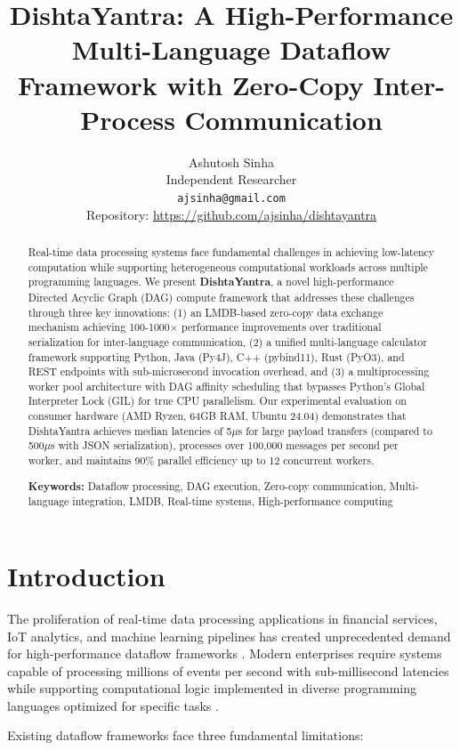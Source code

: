 \documentclass[11pt,a4paper]{article}
\title{\textbf{DishtaYantra: A High-Performance Multi-Language Dataflow Framework with Zero-Copy Inter-Process Communication}}
\author{
    Ashutosh Sinha\\
    Independent Researcher\\
    \texttt{ajsinha@gmail.com}\\[1em]
    Repository: \url{https://github.com/ajsinha/dishtayantra}
}
\date{}
\begin{document}
\maketitle

\begin{abstract}
Real-time data processing systems face fundamental challenges in achieving low-latency computation while supporting heterogeneous computational workloads across multiple programming languages. We present \textbf{DishtaYantra}, a novel high-performance Directed Acyclic Graph (DAG) compute framework that addresses these challenges through three key innovations: (1) an LMDB-based zero-copy data exchange mechanism achieving 100-1000$\times$ performance improvements over traditional serialization for inter-language communication, (2) a unified multi-language calculator framework supporting Python, Java (Py4J), C++ (pybind11), Rust (PyO3), and REST endpoints with sub-microsecond invocation overhead, and (3) a multiprocessing worker pool architecture with DAG affinity scheduling that bypasses Python's Global Interpreter Lock (GIL) for true CPU parallelism. Our experimental evaluation on consumer hardware (AMD Ryzen, 64GB RAM, Ubuntu 24.04) demonstrates that DishtaYantra achieves median latencies of 5$\mu$s for large payload transfers (compared to 500$\mu$s with JSON serialization), processes over 100,000 messages per second per worker, and maintains 90\% parallel efficiency up to 12 concurrent workers.

\textbf{Keywords:} Dataflow processing, DAG execution, Zero-copy communication, Multi-language integration, LMDB, Real-time systems, High-performance computing
\end{abstract}

\section{Introduction}

The proliferation of real-time data processing applications in financial services, IoT analytics, and machine learning pipelines has created unprecedented demand for high-performance dataflow frameworks \cite{akidau2013millwheel, carbone2015flink}. Modern enterprises require systems capable of processing millions of events per second with sub-millisecond latencies while supporting computational logic implemented in diverse programming languages optimized for specific tasks \cite{zaharia2016spark}.

Existing dataflow frameworks face three fundamental limitations:
\end{document}
